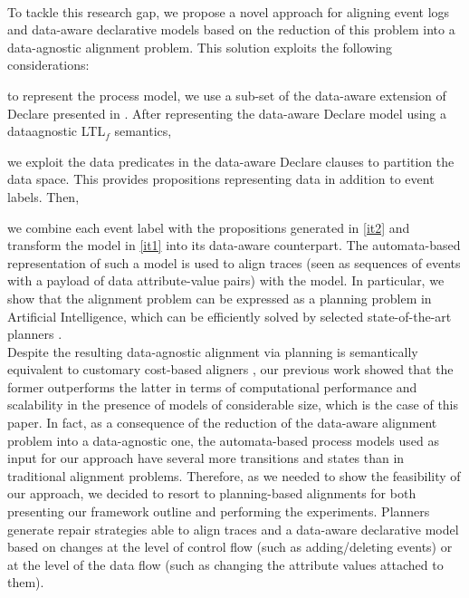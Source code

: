 \\
\indent
To tackle this research gap, we propose a novel approach for aligning event logs and data-aware declarative models based on the reduction of this problem into a data-agnostic alignment problem. This solution exploits the following considerations: \begin{enumerate*}[label=\emph{\alph*})]
	\item \label{it1} to represent the process model, we use a sub-set of the data-aware extension of Declare presented in \cite{BurattinMS16}. After representing the data-aware Declare model using a data\added{-}agnostic LTL$_f$ semantics,
	\item \label{it2} we exploit the data predicates in the data-aware Declare clauses to partition the data space. This provides propositions representing data in addition to event labels. Then,
	\item we combine each event label with the propositions generated in \ref{it2} and transform the model in \ref{it1} into its data-aware counterpart. The automata-based representation of such a model is used to align traces (seen as sequences of events with a payload of data attribute-value pairs) with the model.
In particular, we show that the alignment problem can be expressed as a planning problem in Artificial Intelligence, which can be efficiently solved by selected state-of-the-art planners \cite{XuLZ17a,Marrella17}.
%
\\
\indent
{Despite the resulting data-agnostic alignment via planning is semantically equivalent to customary cost-based aligners \cite{DBLP:conf/edoc/AdriansyahDA11}, our previous work \cite{XuLZ17a} showed that the former outperforms the latter in terms of computational performance and scalability in the presence of models of considerable size, which is the case of this paper. In fact, as a consequence of the reduction of the data-aware alignment problem into a data-agnostic one, the automata-based process models used as input for our approach have several more transitions and states than in traditional alignment problems. Therefore, as we needed to show the feasibility of our approach, we decided to resort to planning-based alignments for both presenting our framework outline and performing the experiments.}
%
%
{Planners generate} repair strategies able to align traces and a data-aware declarative model based on changes at the level of control flow (such as adding/deleting events) or at the level of the data flow (such as changing the attribute values attached to them).
\end{enumerate*}

